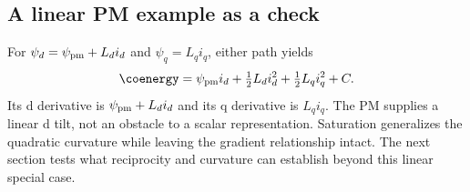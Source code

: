 \subsection{A linear PM example as a check}
For $\psi_d=\psi_{\rm pm}+L_di_d$ and $\psi_q=L_qi_q$, either path yields
\begin{equation}
 \coenergy=\psi_{\rm pm}i_d+\tfrac12L_di_d^2+\tfrac12L_qi_q^2+C.
\end{equation}
Its d derivative is $\psi_{\rm pm}+L_di_d$ and its q derivative is $L_qi_q$.
The PM supplies a linear d tilt, not an obstacle to a scalar representation.
Saturation generalizes the quadratic curvature while leaving the gradient
relationship intact. The next section tests what reciprocity and curvature
can establish beyond this linear special case.
